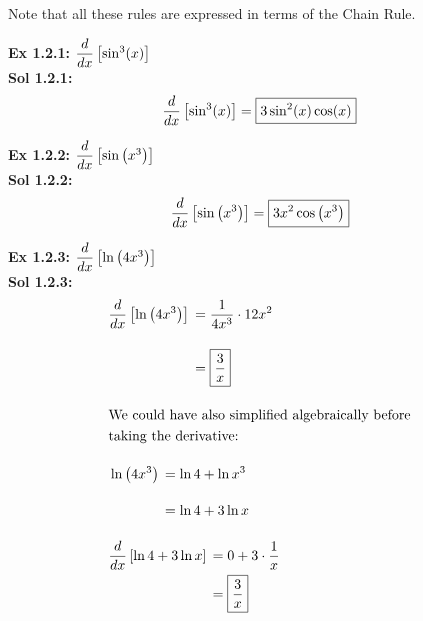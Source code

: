 Note that all these rules are expressed in terms of the Chain Rule.


\textbf{Ex 1.2.1: } $\dfrac{d}{dx} \left[\sin^3 (x)\right]$ \\[11pt]
\textbf{Sol 1.2.1: } \begin{align*}
    \dfrac{d}{dx} \left[\sin^3 (x)\right] = \boxed{3\sin^2 (x)\cos (x)}
\end{align*} 

\textbf{Ex 1.2.2: } $\dfrac{d}{dx} \left[\sin \left(x^3\right)\right]$ \\[11pt]
\textbf{Sol 1.2.2: } \begin{align*}
    \dfrac{d}{dx}\left[\sin \left(x^3\right)\right] = \boxed{3x^2\cos  \left(x^3\right)}
\end{align*}

\textbf{Ex 1.2.3: } $\dfrac{d}{dx} \left[\ln \left(4x^3\right)\right]$ \\[11pt]
\textbf{Sol 1.2.3: } \begin{align*}
    & \dfrac{d}{dx} \left[\ln \left(4x^3\right)\right] \begin{aligned}[t]
        & = \dfrac{1}{4x^3} \cdot 12x^2 \\[11pt]
        & = \boxed{\dfrac{3}{x}} 
    \end{aligned} \\[11pt]
    & \text{We could have also simplified algebraically before} \\
    & \text{taking the derivative: } \\[11pt]
    & \ln \left(4x^3\right) \begin{aligned}[t]
        & = \ln 4 + \ln x^3 \\[11pt]
        & = \ln 4 + 3\ln x 
    \end{aligned} \\[11pt]
    & \dfrac{d}{dx} \left[\ln 4 + 3\ln x\right] \begin{aligned}[t]
        & = 0 + 3 \cdot \dfrac{1}{x} \\
        & = \boxed{\dfrac{3}{x}}
    \end{aligned}
\end{align*}

